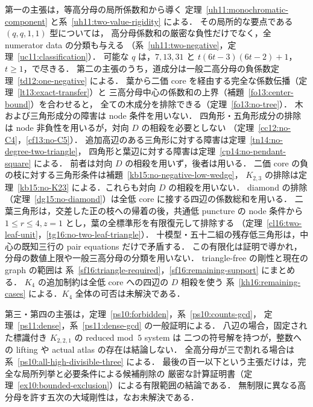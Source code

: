 第一の主張は，等高分母の局所係数和から導く
定理~\ref{uh11:monochromatic-component} と系~\ref{uh11:two-value-rigidity} による．
その局所的な要点である $(q,q,1,1)$ 型については，
高分母係数和の厳密な負性だけでなく，全 numerator data の分類も与える
（系~\ref{uh11:two-negative}，定理~\ref{uc11:classification}）．
可能な $q$ は，$7,13,31$ と $t(6t-3)(6t-2)+1$，$t\geq1$，で尽きる．
第二の主張のうち，道成分は一般二高分母の負係数定理~\ref{td12:one-negative} による．
葉から二価 core を経由する完全な係数伝播（定理~\ref{lt13:exact-transfer}）と
三高分母中心の係数和の上界（補題~\ref{fo13:center-bound}）を合わせると，
全ての木成分を排除できる（定理~\ref{fo13:no-tree}）．
木および三角形成分の障害は node 条件を用いない．
四角形・五角形成分の排除は node 非負性を用いるが，対向 $D$ の相殺を必要としない
（定理~\ref{cc12:no-C4}，\ref{cf13:no-C5}）．
追加高辺のある三角形に対する障害は定理~\ref{tn14:no-degree-two-triangle}，
四角形と葉辺に対する障害は定理~\ref{cp14:no-pendant-square} による．
前者は対向 $D$ の相殺を用いず，後者は用いる．
二価 core の負の枝に対する三角形条件は補題~\ref{kb15:no-negative-low-wedge}，
$K_{2,3}$ の排除は定理~\ref{kb15:no-K23} による．これらも対向 $D$ の相殺を用いない．
diamond の排除（定理~\ref{dg15:no-diamond}）は全低 core に接する四辺の係数総和を用いる．
二葉三角形は，交差した正の枝への帰着の後，共通低 puncture の node 条件から
$1\le r\le4,z=1$ とし，葉の全標準形を有限復元して排除する
（定理~\ref{cl16:two-leaf-unit}，\ref{tg16:no-two-leaf-triangle}）．
十模型・五十二組の残存低三角形は，中心の既知三行の pair equations だけで矛盾する．
この有限化は証明で導かれ，分母の数値上限や一般三高分母の分類を用いない．
triangle-free の剛性と現在の graph の範囲は
系~\ref{sf16:triangle-required}，\ref{sf16:remaining-support} にまとめる．
$K_4$ の追加制約は全低 core への四辺の $D$ 相殺を使う
系~\ref{kh16:remaining-cases} による．$K_4$ 全体の可否は未解決である．

第三・第四の主張は，定理~\ref{ps10:forbidden}，系~\ref{ps10:counts-gcd}，
定理~\ref{ps11:dense}，系~\ref{ps11:dense-gcd} の一般証明による．
八辺の場合，固定された標識付き $K_{2,2,1}$ の reduced mod~$5$ system は
二つの符号解を持つが，整数への lifting や actual atlas の存在は結論しない．
全高分母が三で割れる場合は系~\ref{ps10:all-high-divisible-three} による．
最後の百一以下という主張だけは，完全な局所列挙と必要条件による候補削除の
厳密な計算証明書（定理~\ref{ex10:bounded-exclusion}）による有限範囲の結論である．
無制限に異なる高分母を許す五次の大域剛性は，なお未解決である．
